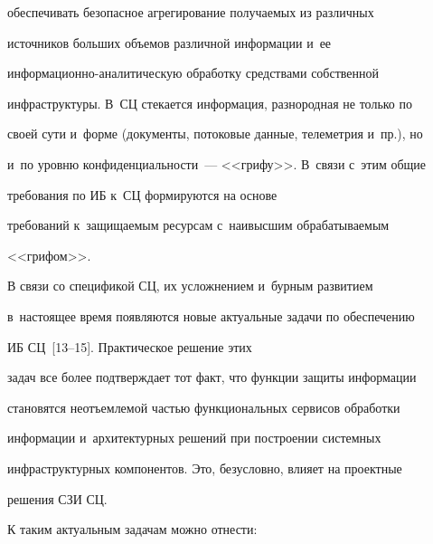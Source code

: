 обеспечивать безопасное агрегирование получаемых из различных 

источников больших объемов различной информации и~ее  

ин\-фор\-ма\-ци\-он\-но-ана\-ли\-ти\-че\-скую обработку средствами собственной 

инфраструктуры. В~СЦ стекается информация, разнородная не только по 

своей сути и~форме (документы, потоковые данные, телеметрия и~пр.), но 

и~по уровню конфиденциальности~--- <<грифу>>. В~связи с~этим общие 

требования по ИБ к~СЦ формируются на основе 

требований к~защищаемым ресурсам с~наивысшим обрабатываемым 

<<грифом>>.

    

    В связи со спецификой СЦ, их усложнением и~бурным развитием 

в~настоящее время появляются новые актуальные задачи по обеспечению 

ИБ СЦ~[13--15]. Практическое решение этих 

задач все более подтверждает тот факт, что функции защиты информации 

становятся неотъемлемой частью функциональных сервисов обработки 

информации и~архитектурных решений при по\-стро\-ении сис\-тем\-ных 

инфраструктурных компонентов. Это, безусловно, влияет на проектные 

решения СЗИ СЦ.

    

    К таким актуальным задачам можно отнести:


